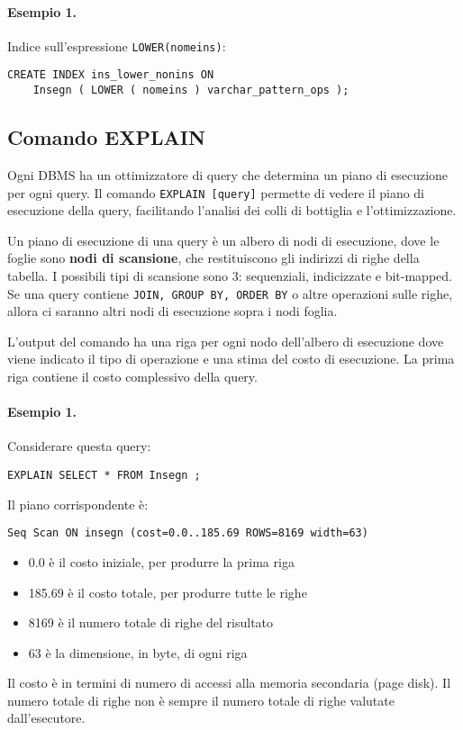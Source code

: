 \documentclass[a4paper, 10pt, titlepage]{article}
\begin{document}
\paragraph{Esempio 1.}Indice sull'espressione \lstinline|LOWER(nomeins)|:
\begin{lstlisting}
CREATE INDEX ins_lower_nonins ON
	Insegn ( LOWER ( nomeins ) varchar_pattern_ops );
\end{lstlisting}

 	\subsection{Comando EXPLAIN}
	Ogni DBMS ha un ottimizzatore di query che determina un piano di esecuzione per ogni query. Il comando \lstinline|EXPLAIN [query]| permette di vedere il piano di esecuzione della query, facilitando l'analisi dei colli di bottiglia e l'ottimizzazione.
	
	Un piano di esecuzione di una query è un albero di nodi di esecuzione, dove le foglie sono \textbf{nodi di scansione}, che restituiscono gli indirizzi di righe della tabella. I possibili tipi di scansione sono 3: sequenziali, indicizzate e bit-mapped. Se una query contiene \lstinline|JOIN, GROUP BY, ORDER BY| o altre operazioni sulle righe, allora ci saranno altri nodi di esecuzione sopra i nodi foglia.
	
	L'output del comando ha una riga per ogni nodo dell'albero di esecuzione dove viene indicato il tipo di operazione e una stima del costo di esecuzione. La prima riga contiene il costo complessivo della query.
	
	\paragraph{Esempio 1.}
	Considerare questa query:
	\begin{lstlisting}
EXPLAIN SELECT * FROM Insegn ;
	\end{lstlisting}
	Il piano corrispondente è:
	\begin{lstlisting}
Seq Scan ON insegn (cost=0.0..185.69 ROWS=8169 width=63)
	\end{lstlisting}
	\begin{itemize}
	\item 0.0 è il costo iniziale, per produrre la prima riga 
	\item 185.69 è il costo totale, per produrre tutte le righe
	\item 8169 è il numero totale di righe del risultato
	\item 63 è la dimensione, in byte, di ogni riga
	\end{itemize} 
	Il costo è in termini di numero di accessi alla memoria secondaria (page disk). Il numero totale di righe non è sempre il numero totale di righe valutate dall’esecutore.\medskip
	
\end{document}
